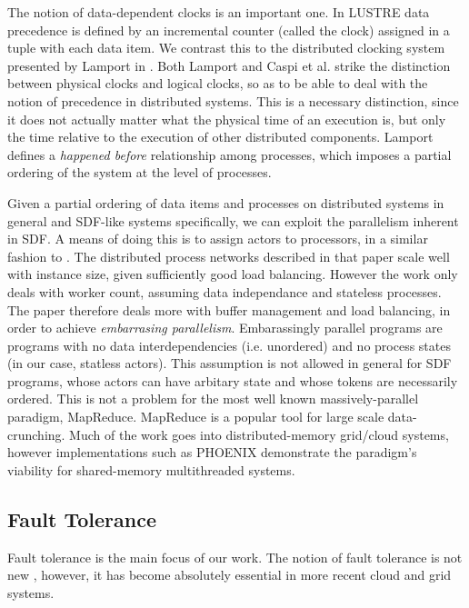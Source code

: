 The notion of data-dependent clocks is an important one.
In LUSTRE data precedence is defined by an incremental counter (called the clock) assigned in a tuple with each data item.
We contrast this to the distributed clocking system presented by Lamport in \cite{lam78}.
Both Lamport and Caspi et al. strike the distinction between physical clocks and logical clocks, so as to be able to deal with the notion of precedence in distributed systems.
This is a necessary distinction, since it does not actually matter what the physical time of an execution is, but only the time relative to the execution of other distributed components.
Lamport defines a {\em happened before} relationship among processes, which imposes a partial ordering of the system at the level of processes.

Given a partial ordering of data items and processes on distributed systems in general and SDF-like systems specifically, we can exploit the parallelism inherent in SDF.
A means of doing this is to assign actors to processors, in a similar fashion to \cite{par03}.
The distributed process networks described in that paper scale well with instance size, given sufficiently good load balancing.
However the work only deals with worker count, assuming data independance and stateless processes.
The paper therefore deals more with buffer management and load balancing, in order to achieve {\em embarrasing parallelism}.
Embarassingly parallel programs are programs with no data interdependencies (i.e. unordered) and no process states (in our case, statless actors).
This assumption is not allowed in general for SDF programs, whose actors can have arbitary state and whose tokens are necessarily ordered.
This is not a problem for the most well known massively-parallel paradigm, MapReduce.
MapReduce \cite{dea08} is a popular tool for large scale data-crunching.
Much of the work goes into distributed-memory grid/cloud systems, however implementations such as PHOENIX \cite{ran07} demonstrate the paradigm's viability for shared-memory multithreaded systems.

\subsection{Fault Tolerance}

Fault tolerance is the main focus of our work.
The notion of fault tolerance is not new \cite{ran75}, however, it has become absolutely essential in more recent cloud and grid systems.

